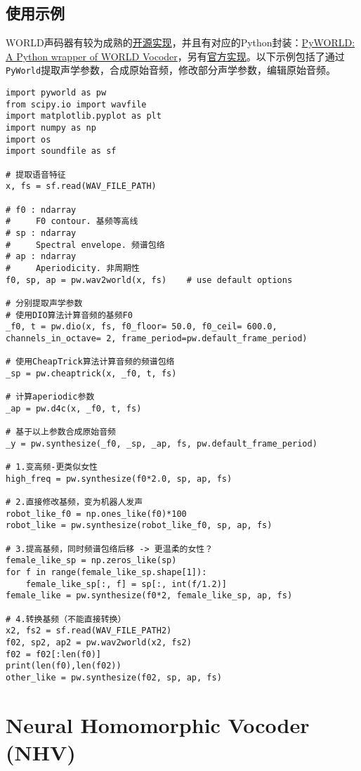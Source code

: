 \documentclass[cn,10pt,math=newtx,citestyle=gb7714-2015,bibstyle=gb7714-2015]{elegantbook}
\begin{document}
\subsection{使用示例}

WORLD声码器有较为成熟的\href{https://github.com/mmorise/World}{开源实现}，并且有对应的Python封装：\href{https://github.com/JeremyCCHsu/Python-Wrapper-for-World-Vocoder}{PyWORLD: A Python wrapper of WORLD Vocoder}，另有\href{http://ml.cs.yamanashi.ac.jp/world/english}{官方实现}。以下示例包括了通过\lstinline{PyWorld}提取声学参数，合成原始音频，修改部分声学参数，编辑原始音频。

\begin{lstlisting}
import pyworld as pw
from scipy.io import wavfile
import matplotlib.pyplot as plt
import numpy as np
import os
import soundfile as sf

# 提取语音特征
x, fs = sf.read(WAV_FILE_PATH)

# f0 : ndarray
#     F0 contour. 基频等高线
# sp : ndarray
#     Spectral envelope. 频谱包络
# ap : ndarray
#     Aperiodicity. 非周期性
f0, sp, ap = pw.wav2world(x, fs)    # use default options

# 分别提取声学参数
# 使用DIO算法计算音频的基频F0
_f0, t = pw.dio(x, fs, f0_floor= 50.0, f0_ceil= 600.0, channels_in_octave= 2, frame_period=pw.default_frame_period)

# 使用CheapTrick算法计算音频的频谱包络
_sp = pw.cheaptrick(x, _f0, t, fs)

# 计算aperiodic参数
_ap = pw.d4c(x, _f0, t, fs)

# 基于以上参数合成原始音频
_y = pw.synthesize(_f0, _sp, _ap, fs, pw.default_frame_period)

# 1.变高频-更类似女性
high_freq = pw.synthesize(f0*2.0, sp, ap, fs)

# 2.直接修改基频，变为机器人发声
robot_like_f0 = np.ones_like(f0)*100
robot_like = pw.synthesize(robot_like_f0, sp, ap, fs)

# 3.提高基频，同时频谱包络后移 -> 更温柔的女性？
female_like_sp = np.zeros_like(sp)
for f in range(female_like_sp.shape[1]):
    female_like_sp[:, f] = sp[:, int(f/1.2)]
female_like = pw.synthesize(f0*2, female_like_sp, ap, fs)

# 4.转换基频（不能直接转换）
x2, fs2 = sf.read(WAV_FILE_PATH2)
f02, sp2, ap2 = pw.wav2world(x2, fs2)
f02 = f02[:len(f0)]
print(len(f0),len(f02))
other_like = pw.synthesize(f02, sp, ap, fs)
\end{lstlisting}

\section{Neural Homomorphic Vocoder (NHV)}
\end{document}
